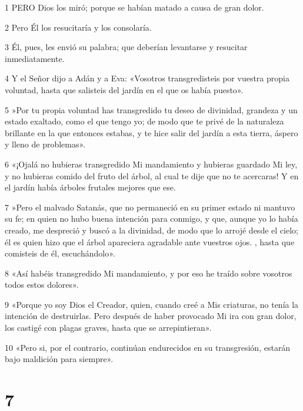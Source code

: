 \par 1 PERO Dios los miró; porque se habían matado a causa de gran dolor.

\par 2 Pero Él los resucitaría y los consolaría.

\par 3 Él, pues, les envió su palabra; que deberían levantarse y resucitar inmediatamente.

\par 4 Y el Señor dijo a Adán y a Eva: «Vosotros transgredisteis por vuestra propia voluntad, hasta que salisteis del jardín en el que os había puesto».

\par 5 »Por tu propia voluntad has transgredido tu deseo de divinidad, grandeza y un estado exaltado, como el que tengo yo; de modo que te privé de la naturaleza brillante en la que entonces estabas, y te hice salir del jardín a esta tierra, áspero y lleno de problemas».

\par 6 «¡Ojalá no hubieras transgredido Mi mandamiento y hubieras guardado Mi ley, y no hubieras comido del fruto del árbol, al cual te dije que no te acercaras! Y en el jardín había árboles frutales mejores que ese.

\par 7 »Pero el malvado Satanás, que no permaneció en su primer estado ni mantuvo su fe; en quien no hubo buena intención para conmigo, y que, aunque yo lo había creado, me despreció y buscó a la divinidad, de modo que lo arrojé desde el cielo; él es quien hizo que el árbol apareciera agradable ante vuestros ojos. , hasta que comisteis de él, escuchándolo».

\par 8 «Así habéis transgredido Mi mandamiento, y por eso he traído sobre vosotros todos estos dolores».

\par 9 «Porque yo soy Dios el Creador, quien, cuando creé a Mis criaturas, no tenía la intención de destruirlas. Pero después de haber provocado Mi ira con gran dolor, los castigé con plagas graves, hasta que se arrepintieran».

\par 10 «Pero si, por el contrario, continúan endurecidos en su transgresión, estarán bajo maldición para siempre».

\chapter{7}


